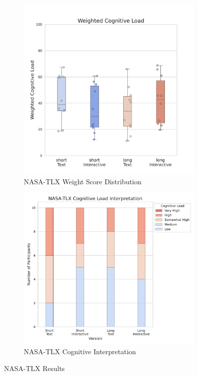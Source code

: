 \begin{figure}[ht]
    \centering
    \begin{subfigure}[b]{0.45\textwidth}
        \centering
        \includegraphics[width=\textwidth]{content/image/results/nasatlx_final_value.pdf}
        \caption{NASA-TLX Weight Score Distribution}
        \label{fig:nasatlx-final1}
    \end{subfigure}
    \hfill
    \begin{subfigure}[b]{0.47\textwidth}
        \centering
        \includegraphics[width=\textwidth]{content/image/results/nasatlx_cog_value_interpreted.pdf}
        \caption{NASA-TLX Cognitive Interpretation}
        \label{fig:nasatlx-final2}
    \end{subfigure}
    \caption{NASA-TLX Results}
    \label{fig:nasatlx-final}
\end{figure}

